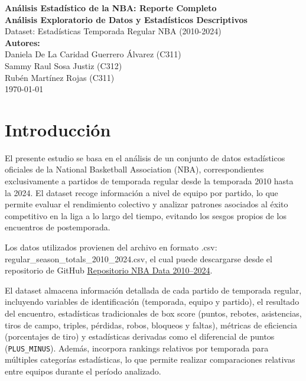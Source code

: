 \documentclass[12pt]{article}
\begin{document}
\begin{titlepage}
    \centering
    \vspace*{1cm}
    \LARGE\textbf{Análisis Estadístico de la NBA: Reporte Completo}\\
    \vspace{0.5cm}
    \large\textbf{Análisis Exploratorio de Datos y Estadísticos Descriptivos}\\
    \vspace{1.5cm}
    \normalsize Dataset: Estadísticas Temporada Regular NBA (2010-2024)\\
    \vspace{2cm}
    \textbf{Autores:}\\
    Daniela De La Caridad Guerrero Álvarez (C311)\\
    Sammy Raul Sosa Justiz (C312)\\
    Rubén Martínez Rojas (C311)\\
    \vfill
    \today
\end{titlepage}

\tableofcontents
\newpage

\section*{Introducción}


El presente estudio se basa en el análisis de un conjunto de datos estadísticos oficiales de la National Basketball Association (NBA), correspondientes exclusivamente a partidos de temporada regular desde la temporada 2010 hasta la 2024. El dataset recoge información a nivel de equipo por partido, lo que permite evaluar el rendimiento colectivo y analizar patrones asociados al éxito competitivo en la liga a lo largo del tiempo, evitando los sesgos propios de los encuentros de postemporada.

Los datos utilizados provienen del archivo en formato .csv: regular\_season\_totals\_2010\_2024.csv, el cual puede descargarse desde el repositorio de GitHub \href{https://github.com/NocturneBear/NBA-Data-2010-2024}{Repositorio NBA Data 2010--2024}.


El dataset almacena información detallada de cada partido de temporada regular, incluyendo variables de identificación (temporada, equipo y partido), el resultado del encuentro, estadísticas tradicionales de box score (puntos, rebotes, asistencias, tiros de campo, triples, pérdidas, robos, bloqueos y faltas), métricas de eficiencia (porcentajes de tiro) y estadísticas derivadas como el diferencial de puntos (\texttt{PLUS\_MINUS}). Además, incorpora rankings relativos por temporada para múltiples categorías estadísticas, lo que permite realizar comparaciones relativas entre equipos durante el período analizado.
\end{document}
